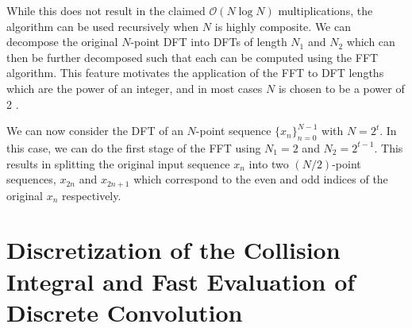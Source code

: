 \documentclass[12pt]{CSUNthesis}
\begin{document}
While this does not result in the claimed $\mathcal{O}(N \log N)$ multiplications, the algorithm can be used recursively when $N$ is highly composite. We can decompose the original $N$-point DFT into DFTs of length $N_1$ and $N_2$ which can then be further decomposed such that each can be computed using the FFT algorithm. This feature motivates the application of the FFT to DFT lengths which are the power of an integer, and in most cases $N$ is chosen to be a power of 2 \cite{Nussbaumer1982}.

We can now consider the DFT of an $N$-point sequence $\{x_n\}_{n=0}^{N-1}$ with $N=2^t$. In this case, we can do the first stage of the FFT using $N_1 = 2$ and $N_2 = 2^{t-1}$. This results in splitting the original input sequence $x_n$ into two $(N/2)$-point sequences, $x_{2n}$ and $x_{2n+1}$ which correspond to the even and odd indices of the original $x_n$ respectively.

\chapter{Discretization of the Collision Integral and Fast Evaluation of Discrete Convolution}
\end{document}
